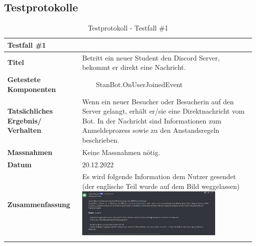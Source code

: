 \documentclass[a4paper, table]{article}
\newcommand{\tabitem}{~~\llap{\textbullet}~~}
\begin{document}
\subsection{Testprotokolle}\label{test-protocols}
\begin{longtable}[h]{|p{9em}|p{31em}|}
    \hline
    \multicolumn{2}{|l|}{\textbf{Testfall \#1}} \\
    \hline
    \textbf{Titel} & Betritt ein neuer Student den Discord Server, bekommt er direkt eine Nachricht. \\
    \hline
    \textbf{Getestete Komponenten} & 
        \tabitem StanBot.OnUserJoinedEvent \\
    \hline
    \textbf{Tatsächliches Ergebnis/ Verhalten} & 
        Wenn ein neuer Besucher oder Besucherin auf den Server gelangt, erhält er/sie eine Direktnachricht vom Bot.
        In der Nachricht sind Informationen zum Anmeldeprozess sowie zu den Anstandsregeln beschrieben. \\
    \hline
    \textbf{Massnahmen} & Keine Massnahmen nötig. \\
    \hline
    \textbf{Datum} & 20.12.2022 \\
    \hline
    \textbf{Zusammenfassung} & 
        Es wird folgende Information dem Nutzer gesendet (der englische Teil wurde auf dem Bild weggelassen) 
        \includegraphics[width=0.8\textwidth]{img/Tests/1_Test_InfoMessage.png} \\
    \hline
    \caption{Testprotokoll - Testfall \#1}
\end{longtable}
\end{document}
